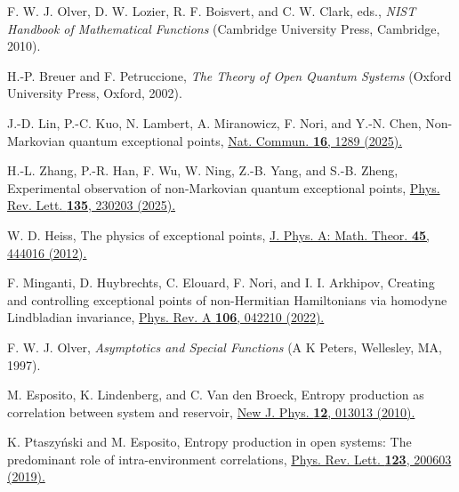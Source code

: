 \documentclass[reprint,superscriptaddress,floatfix,amsmath,amssymb,prresearch,aps]{revtex4-2}
\newcommand{\doilink}[2]{\href{https://doi.org/#1}{#2}}
\begin{document}
\begin{thebibliography}{99}
F. W. J. Olver, D. W. Lozier, R. F. Boisvert, and C. W. Clark, eds.,
\textit{NIST Handbook of Mathematical Functions}
(Cambridge University Press, Cambridge, 2010).

H.-P. Breuer and F. Petruccione,
\textit{The Theory of Open Quantum Systems}
(Oxford University Press, Oxford, 2002).

J.-D. Lin, P.-C. Kuo, N. Lambert, A. Miranowicz, F. Nori, and Y.-N. Chen,
Non-Markovian quantum exceptional points,
\doilink{10.1038/s41467-025-56242-w}{Nat. Commun. \textbf{16}, 1289 (2025).}

H.-L. Zhang, P.-R. Han, F. Wu, W. Ning, Z.-B. Yang, and S.-B. Zheng,
Experimental observation of non-Markovian quantum exceptional points,
\doilink{10.1103/jk6y-55xp}{Phys. Rev. Lett. \textbf{135}, 230203 (2025).}

W. D. Heiss,
The physics of exceptional points,
\doilink{10.1088/1751-8113/45/44/444016}{J. Phys. A: Math. Theor. \textbf{45}, 444016 (2012).}

F. Minganti, D. Huybrechts, C. Elouard, F. Nori, and I. I. Arkhipov,
Creating and controlling exceptional points of non-Hermitian Hamiltonians via
homodyne Lindbladian invariance,
\doilink{10.1103/PhysRevA.106.042210}{Phys. Rev. A \textbf{106}, 042210 (2022).}

F. W. J. Olver,
\textit{Asymptotics and Special Functions}
(A K Peters, Wellesley, MA, 1997).

M. Esposito, K. Lindenberg, and C. Van den Broeck,
Entropy production as correlation between system and reservoir,
\doilink{10.1088/1367-2630/12/1/013013}{New J. Phys. \textbf{12}, 013013 (2010).}

K. Ptaszy\'nski and M. Esposito,
Entropy production in open systems: The predominant role of
intra-environment correlations,
\doilink{10.1103/PhysRevLett.123.200603}{Phys. Rev. Lett. \textbf{123}, 200603 (2019).}

\end{thebibliography}
\end{document}
